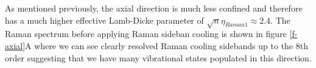 \documentclass[aps,prl,twocolumn,groupedaddress]{revtex4-1}
\begin{document}
As mentioned previously, the axial direction is much less confined and therefore has a much higher
effective Lamb-Dicke parameter of $\sqrt{n}\eta_{Raman1}\approx2.4$. The Raman spectrum before applying Raman sideban cooling is shown in figure \ref{f-axial}A where we can see clearly resolved Raman cooling sidebands up to the 8th order suggesting that we have many vibrational states populated in this direction.\\

\ \\
\ \\
\ \\
\ \\
\ \\
\ \\
\ \\
\ \\
\ \\
\ \\
\ \\
\ \\
\ \\
\ \\
\ \\
\ \\
\ \\
\ \\
\ \\
\ \\
\ \\
\ \\
\ \\
\ \\
\ \\
\ \\
\ \\
\ \\
\ \\
\ \\
\ \\
\ \\
\ \\
\ \\
\ \\
\ \\
\ \\
\ \\
\ \\
\ \\
\ \\
\ \\
\ \\
\ \\
\ \\
\ \\
\ \\
\end{document}
